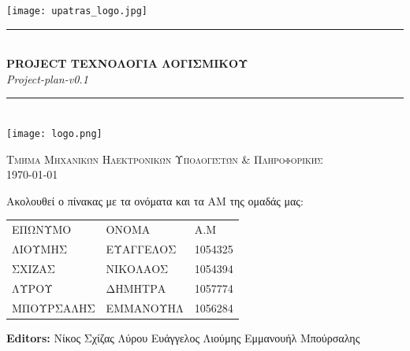 \documentclass[12pt,a4paper,oneside]{article}
\newcommand{\HRule}{\rule{\linewidth}{0.5mm}}
\begin{document}
\renewcommand{\contentsname}{Περιεχόμενα}

\renewcommand{\refname}{Αναφορές}

\begin{titlepage}
\begin{center}

\texttt{[image: upatras\_logo.jpg]}~\\[2cm]


\HRule \\[0.4cm]
{ \LARGE 
  \textbf{PROJECT TΕΧΝΟΛΟΓΙΑ ΛΟΓΙΣΜΙΚΟΥ}\\[0.4cm]
  \emph{Project-plan-v0.1}\\[0.4cm]
}
\HRule \\[1.5cm]



{ \large
  \texttt{[image: logo.png]}~\\[2cm]
 
}

\vfill

\textsc{\large Τμήμα Μηχανικών Ηλεκτρονικών Υπολογιστών \& Πληροφορικής}\\[0.4cm]


{\large {}\today}
 
\end{center}
\end{titlepage}
\pagestyle{fancy}
\centering
Ακολουθεί ο πίνακας με τα ονόματα και τα ΑΜ της ομαδάς μας:

\centering
\begin{tabular}{ |p{4cm}|p{4cm}|p{3cm}|}
\arrayrulecolor{gray}
 \hline
 \multicolumn{3}{|c|}{Μέλη} \\
 \hline
 ΕΠΩΝΥΜΟ& ΟΝΟΜΑ & Α.M\\
 \hline
 ΛΙΟΥΜΗΣ   & ΕΥΑΓΓΕΛΟΣ    & 1054325\\
 ΣΧΙΖΑΣ &  ΝΙΚΟΛΑΟΣ & 1054394\\
 ΛΥΡΟΥ & ΔΗΜΗΤΡΑ & 1057774\\
 ΜΠΟΥΡΣΑΛΗΣ   & ΕΜΜΑΝΟΥΗΛ & 1056284\\
\hline 

\end{tabular}


\vspace{7cm}
\raggedright
\textbf{Editors:}
\newline
Νίκος Σχίζας
 Λύρου
\newline
Ευάγγελος Λιούμης
\newline
Εμμανουήλ Μπούρσαλης
\end{document}

